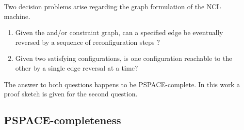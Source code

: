 \begin{defn}
Two decision problems arise regarding the graph formulation of the  NCL machine. 
\begin{enumerate}
    \item Given the and/or constraint graph, can a specified edge be eventually reversed by a sequence of reconfiguration steps ?
    \item Given two satisfying configurations, is one configuration reachable to the other by a single edge reversal at a time? 
\end{enumerate}
The answer to both questions happens to be PSPACE-complete. 
In this work a proof sketch is given for the second question.
\end{defn}

\subsection{PSPACE-completeness}

